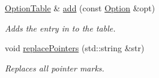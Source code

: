 \begin{DoxyCompactItemize}
\hyperlink{classpoptmx_1_1OptionTable}{OptionTable} \& \hyperlink{classpoptmx_1_1OptionTable_a19543d734743ed851ce0b9036383dcc7}{add} (const \hyperlink{classpoptmx_1_1Option}{Option} \&opt)
\begin{DoxyCompactList}\small\item\em Adds the entry in to the table. \item\end{DoxyCompactList}\item 
void \hyperlink{classpoptmx_1_1OptionTable_a8e32100929c2bfe52196e8f7ffd39b60}{replacePointers} (std::string \&str)
\begin{DoxyCompactList}\small\item\em Replaces all pointer marks. \item\end{DoxyCompactList}\end{DoxyCompactItemize}
